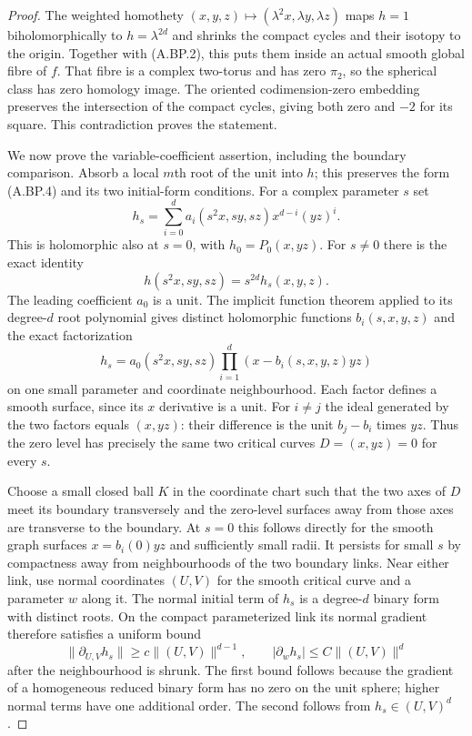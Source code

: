 \begin{proof}
The weighted homothety
$(x,y,z)\mapsto(\lambda^2x,\lambda y,\lambda z)$
maps $h=1$ biholomorphically to $h=\lambda^{2d}$
and shrinks the compact cycles and their isotopy
to the origin. Together with (A.BP.2), this puts
them inside an actual smooth global fibre of $f$.
That fibre is a complex two-torus and has zero
$\pi_2$, so the spherical class has zero homology
image. The oriented codimension-zero embedding
preserves the intersection of the compact cycles,
giving both zero and $-2$ for its square. This
contradiction proves the statement.

We now prove the variable-coefficient assertion,
including the boundary comparison. Absorb a local
$m$th root of the unit into $h$; this preserves the
form (A.BP.4) and its two initial-form conditions.
For a complex parameter $s$ set
\[
 h_s=\sum_{i=0}^d a_i(s^2x,sy,sz)x^{d-i}(yz)^i.
                                                        \tag{A.BP.5}
\]
This is holomorphic also at $s=0$, with
$h_0=P_0(x,yz)$. For $s\ne0$ there is the exact
identity
\[
       h(s^2x,sy,sz)=s^{2d}h_s(x,y,z).           \tag{A.BP.6}
\]
The leading coefficient $a_0$ is a unit. The implicit
function theorem applied to its degree-$d$ root
polynomial gives distinct holomorphic functions
$b_i(s,x,y,z)$ and the exact factorization
\[
       h_s=a_0(s^2x,sy,sz)
                     \prod_{i=1}^d(x-b_i(s,x,y,z)yz)
                                                        \tag{A.BP.7}
\]
on one small parameter and coordinate neighbourhood.
Each factor defines a smooth surface, since its
$x$ derivative is a unit. For $i\ne j$ the ideal
generated by the two factors equals $(x,yz)$:
their difference is the unit $b_j-b_i$ times $yz$.
Thus the zero level has precisely the same two
critical curves $D=(x,yz)=0$ for every $s$.

Choose a small closed ball $K$ in the coordinate
chart such that the two axes of $D$ meet its boundary
transversely and the zero-level surfaces away from
those axes are transverse to the boundary. At
$s=0$ this follows directly for the smooth graph
surfaces $x=b_i(0)yz$ and sufficiently small radii.
It persists for small $s$ by compactness away from
neighbourhoods of the two boundary links.
Near either link, use normal coordinates $(U,V)$
for the smooth critical curve and a parameter $w$
along it. The normal initial term of $h_s$ is a
degree-$d$ binary form with distinct roots.
On the compact parameterized link its normal
gradient therefore satisfies a uniform bound
\[
 \|\partial_{U,V}h_s\|\ge c\|(U,V)\|^{d-1},
 \qquad |\partial_w h_s|\le C\|(U,V)\|^d
                                                        \tag{A.BP.8}
\]
after the neighbourhood is shrunk. The first bound
follows because the gradient of a homogeneous
reduced binary form has no zero on the unit sphere;
higher normal terms have one additional order.
The second follows from $h_s\in(U,V)^d$.


\end{proof}
